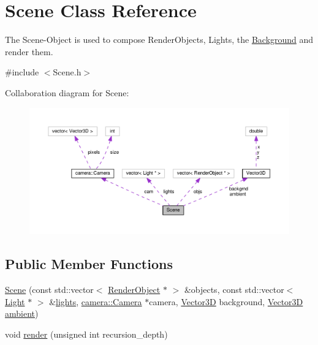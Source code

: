 \hypertarget{classScene}{}\section{Scene Class Reference}
\label{classScene}


The Scene-\/\+Object is used to compose Render\+Objects, Lights, the \hyperlink{classBackground}{Background} and render them.  




{\ttfamily \#include $<$Scene.\+h$>$}



Collaboration diagram for Scene\+:\nopagebreak
\begin{figure}[H]
\begin{center}
\leavevmode
\includegraphics[width=350pt]{classScene__coll__graph}
\end{center}
\end{figure}
\subsection*{Public Member Functions}
\begin{DoxyCompactItemize}
\item 
\hyperlink{classScene_aa05f285f7a7df49c03ce32fb1c43c9ae}{Scene} (const std\+::vector$<$ \hyperlink{classRenderObject}{Render\+Object} $\ast$ $>$ \&objects, const std\+::vector$<$ \hyperlink{classLight}{Light} $\ast$ $>$ \&\hyperlink{classScene_a4ecc3182a80435e1c4dfbe1b20e559bd}{lights}, \hyperlink{classcamera_1_1Camera}{camera\+::\+Camera} $\ast$camera, \hyperlink{classVector3D}{Vector3D} background, \hyperlink{classVector3D}{Vector3D} \hyperlink{classScene_a284ce5b2aeb47c64d6712d9748229c47}{ambient})
\item 
void \hyperlink{classScene_a19a594ba70c411fb6fddb1e9d772da52}{render} (unsigned int recursion\+\_\+depth)
\end{DoxyCompactItemize}
